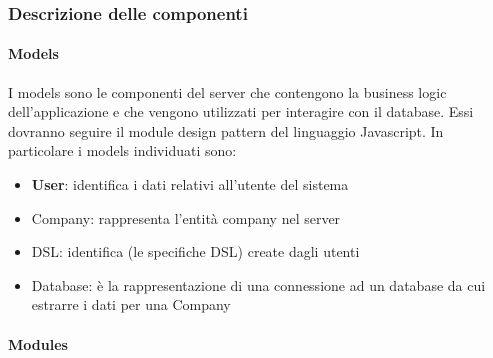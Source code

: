 
\subsubsection{Descrizione delle componenti} %

\paragraph*{Models}

I models sono le componenti del server che contengono la business logic dell'applicazione e che vengono utilizzati per interagire con il database.
Essi dovranno seguire il module design pattern del linguaggio Javascript. %
In particolare i models individuati sono:
\begin{itemize}
\item \textbf{User}: identifica i dati relativi all'utente del sistema
\item Company: rappresenta l'entità company nel server
\item DSL: identifica (le specifiche DSL) create dagli utenti
\item Database: è la rappresentazione di una connessione ad un database da cui estrarre i dati per una Company
\end{itemize}

\paragraph*{Modules}

